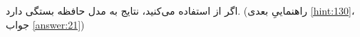\section{}
\paragraph{}\label{hint:21}
اگر از  استفاده می‌کنید، نتایج به مدل حافظه بستگی دارد. (راهنماییِ بعدی \ref{hint:130}، جواب \ref{answer:21})